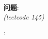     
\begin{description}
    \item{\textbf{问题}}:\\
\textit{(leetcode 145)}
    \item{\textbf{}} : 
    \\
    \begin{lstlisting}
    \end{lstlisting}
    \textit{}
\end{description}
